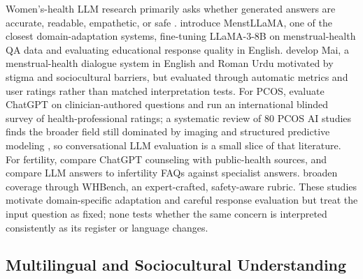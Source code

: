 Women's-health LLM research primarily asks whether generated answers are accurate, readable, empathetic, or safe \citep{recker-etal-2025-large,devries-etal-2025-enhancing}.
\citet{adhikary-etal-2025-menstrual} introduce MenstLLaMA, one of the closest domain-adaptation systems, fine-tuning LLaMA-3-8B on menstrual-health QA data and evaluating educational response quality in English.
\citet{mughal-etal-2025-mai} develop Mai, a menstrual-health dialogue system in English and Roman Urdu motivated by stigma and sociocultural barriers, but evaluated through automatic metrics and user ratings rather than matched interpretation tests.
For PCOS, \citet{devranoglu-etal-2024-chatgpt} evaluate ChatGPT on clinician-authored questions and \citet{graca-etal-2026-assessing} run an international blinded survey of health-professional ratings; a systematic review of 80 PCOS AI studies finds the broader field still dominated by imaging and structured predictive modeling \citep{ghaderzadeh-etal-2025-artificial}, so conversational LLM evaluation is a small slice of that literature.
For fertility, \citet{chervenak-etal-2023-promise} compare ChatGPT counseling with public-health sources, and \citet{gely-etal-2026-large} compare LLM answers to infertility FAQs against specialist answers.
\citet{maurya-etal-2026-whbench} broaden coverage through WHBench, an expert-crafted, safety-aware rubric.
These studies motivate domain-specific adaptation and careful response evaluation but treat the input question as fixed; none tests whether the same concern is interpreted consistently as its register or language changes.

\subsection{Multilingual and Sociocultural Understanding}

